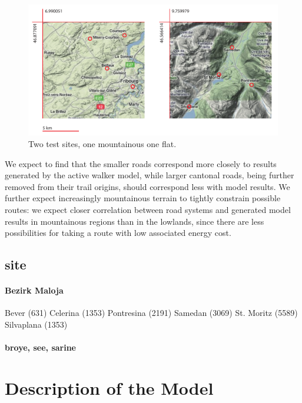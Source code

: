 \documentclass[a4paper, DIV11, abstracton]{scrartcl}
\begin{document}
\begin{figure}[tbp]
	\includegraphics[width=\linewidth]{../figures/site}
	\caption{Two test sites, one mountainous one flat.}
	\label{fig:site}
\end{figure}

We expect to find that the smaller roads correspond more closely to results generated by the active walker model, while larger cantonal roads, being further removed from their trail origins, should correspond less with model results. We further expect increasingly mountainous terrain to tightly constrain possible routes: we expect closer correlation between road systems and generated model results in mountainous regions than in the lowlands, since there are less possibilities for taking a route with low associated energy cost.

\subsection{site}

\paragraph{Bezirk Maloja}
Bever (631)
Celerina (1353)
Pontresina (2191)
Samedan (3069)
St. Moritz (5589)
Silvaplana (1353)

\paragraph{broye, see, sarine}


\section{Description of the Model}
\end{document}
